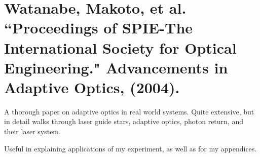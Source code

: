 \documentclass{article}
\begin{document}
\section*{ Watanabe, Makoto, et al. ``Proceedings of SPIE-The International Society for Optical Engineering." Advancements in Adaptive Optics, (2004).}
A thorough paper on adaptive optics in real world systems. Quite extensive, but in detail walks through laser guide stars, adaptive optics, photon return, and their laser system.

Useful in explaining applications of my experiment, as well as for my appendices.

\end{document}
